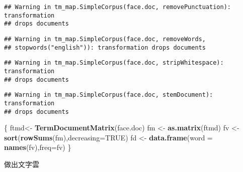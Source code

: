 \documentclass[]{article}
\newenvironment{Shaded}{\begin{snugshade}}{\end{snugshade}}
\newcommand{\KeywordTok}[1]{\textcolor[rgb]{0.13,0.29,0.53}{\textbf{{#1}}}}
\newcommand{\DataTypeTok}[1]{\textcolor[rgb]{0.13,0.29,0.53}{{#1}}}
\newcommand{\DecValTok}[1]{\textcolor[rgb]{0.00,0.00,0.81}{{#1}}}
\newcommand{\FloatTok}[1]{\textcolor[rgb]{0.00,0.00,0.81}{{#1}}}
\newcommand{\StringTok}[1]{\textcolor[rgb]{0.31,0.60,0.02}{{#1}}}
\newcommand{\OtherTok}[1]{\textcolor[rgb]{0.56,0.35,0.01}{{#1}}}
\newcommand{\NormalTok}[1]{{#1}}
\begin{document}
\begin{verbatim}
## Warning in tm_map.SimpleCorpus(face.doc, removePunctuation): transformation
## drops documents
\end{verbatim}

\begin{verbatim}
## Warning in tm_map.SimpleCorpus(face.doc, removeWords,
## stopwords("english")): transformation drops documents
\end{verbatim}

\begin{verbatim}
## Warning in tm_map.SimpleCorpus(face.doc, stripWhitespace): transformation
## drops documents
\end{verbatim}

\begin{verbatim}
## Warning in tm_map.SimpleCorpus(face.doc, stemDocument): transformation
## drops documents
\end{verbatim}

\begin{Shaded}
\begin{Highlighting}[]
\NormalTok{\{}
\NormalTok{ftmd<-}\StringTok{ }\KeywordTok{TermDocumentMatrix}\NormalTok{(face.doc)}
\NormalTok{fm <-}\StringTok{ }\KeywordTok{as.matrix}\NormalTok{(ftmd)}
\NormalTok{fv <-}\StringTok{ }\KeywordTok{sort}\NormalTok{(}\KeywordTok{rowSums}\NormalTok{(fm),}\DataTypeTok{decreasing=}\OtherTok{TRUE}\NormalTok{)}
\NormalTok{fd <-}\StringTok{ }\KeywordTok{data.frame}\NormalTok{(}\DataTypeTok{word =} \KeywordTok{names}\NormalTok{(fv),}\DataTypeTok{freq=}\NormalTok{fv)}
\NormalTok{\}}
\end{Highlighting}
\end{Shaded}

做出文字雲

\begin{Shaded}
\end{Shaded}
\end{document}
